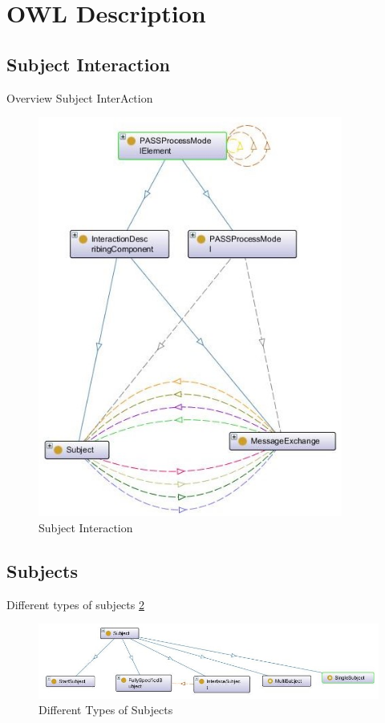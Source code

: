 \newpage

\section{OWL Description}

\subsection{Subject Interaction}
Overview Subject InterAction
\begin{figure}[ph]
	\centering
	\includegraphics[width=10cm]{20181026-Ontologie-Bilder/Grafiken-Ontologie/SUbject-Interaction/20181129-Subject-Message-Exchange}
	\caption[Subject Interaction]{Subject Interaction}
	\label{fig:20181129-subject-message-exchange}
\end{figure}

\newpage

\subsection{Subjects}

Different types of subjects \ref{fig:20181205-subject}
\begin{figure}[ph]
	\centering
	\includegraphics[width=0.7\linewidth]{20181026-Ontologie-Bilder/Grafiken-Ontologie/SUbject-Interaction/20181205-Subject}
	\caption[Subject]{Different Types of Subjects}
	\label{fig:20181205-subject}
\end{figure}


